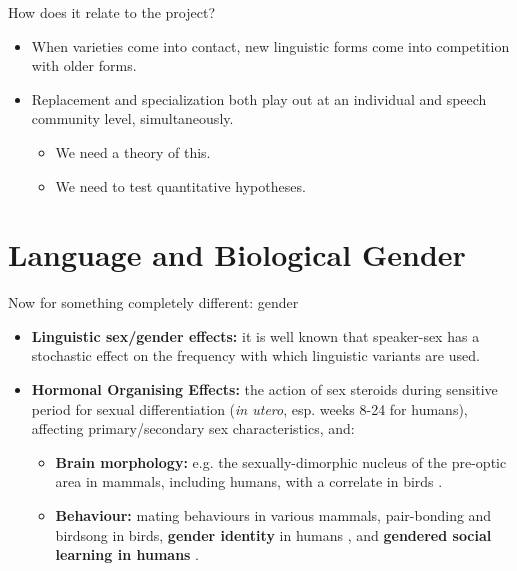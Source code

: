 \documentclass[hyperref={pdfpagelabels=false}]{beamer}
\begin{document}
\begin{frame}{How does it relate to the project?}
		\begin{itemize}
			\item When varieties come into contact, new linguistic forms come into competition with older forms.
			\item Replacement and specialization both play out at an individual and speech community level, simultaneously.
			\begin{itemize}
				\item We need a theory of this.
				\item We need to test quantitative hypotheses.
			\end{itemize}
		\end{itemize}
\end{frame}

\section{Language and Biological Gender} 

\begin{frame}{Now for something completely different: gender}
		\begin{itemize}
		\item \textbf{Linguistic sex/gender effects:} it is well known that speaker-sex has a stochastic effect on the frequency with which linguistic variants are used.
		\item \textbf{Hormonal Organising Effects:} the action of sex steroids during sensitive period for sexual differentiation 
		(\textsl{in utero}, esp. weeks 8-24 for humans), affecting primary/secondary sex characteristics, and:
			\begin{itemize}
				\item \textbf{Brain morphology:} e.g. the sexually-dimorphic nucleus of the pre-optic area in mammals, including humans, with a correlate in birds \citep[see review in][]{balthazart2011}.
				\item \textbf{Behaviour:} mating behaviours in various mammals, pair-bonding and birdsong in birds, \textbf{gender identity} in humans \small{\citep{hinesetal2002, berenbaumbailey2003, hinesetal2004, cohenbendahanetal2005, auyeungetal2009}}, and \textbf{gendered social learning in humans} \citep{hinesetal2016}.
			\end{itemize}
	\end{itemize}
\end{frame}
\end{document}
